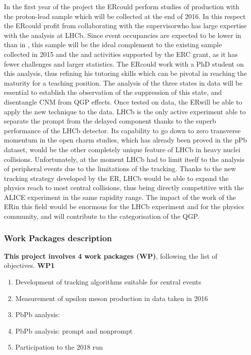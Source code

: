 \documentclass[a4paper,11pt]{article}
\newcommand{\ER}{ER}
\newcommand{\supervisor}{the supervisor}
\begin{document}
In the first year of the project the \ER could perform studies of \PgU
production with the proton-lead sample which will be collected at the
end of 2016. In this respect the \ER could profit from collaborating
with \supervisor who has large expertise with the \PgU analysis at
LHCb. Since event occupancies are expected to be lower in \pPb than in
\PbPb, this sample will be the ideal complement to the existing \PbPb
sample collected in 2015 and the \JPsi and \psiP activities
supported by the ERC grant, as it has fewer challenges and larger
statistics. The \ER could work with a PhD student on this analysis,
thus refining his tutoring skills which can be pivotal in reaching the
maturity for a teaching position.  The analysis of the three \PgUn
states in \pPb data will be essential to establish the observation of
the suppression of this state, and disentangle CNM from QGP effects.
Once tested on \pPb data, the \ER will be able to apply the new
technique to the \PbPb data.  LHCb is the only active experiment able
to separate the prompt from the delayed component thanks to the superb
performance of the LHCb detector. Its capability to go down to zero
transverse momentum in the open charm studies, which has already been
proved in the pPb dataset, would be the other completely unique
feature of LHCb in heavy nuclei collisions. Unfortunately, at the
moment LHCb had to limit itself to the analysis of peripheral events
due to the limitations of the tracking. Thanks to the new tracking
strategy developed by the \ER, LHCb would be able to expand the
physics reach to most central collisions, thus being directly
competitive with the ALICE experiment in the same rapidity range. The
impact of the work of the \ER in this field would be enormous for the
LHCb experiment and for the physics community, and will contribute to
the categorisation of the QGP.

\subsubsection*{Work Packages description}

\textbf{This project involves 4 work packages (WP)}, following the list of objectives. \textbf{WP1}

\begin{enumerate}
 \item Development of tracking algorithms suitable for central events
 \item Measurement of upsilon meson production in \pPb data taken in 2016
 \item PbPb analysis: \Dz 
 \item PbPb analysis: prompt and nonprompt \Jpsi
 \item Participation to the 2018 \PbPb run
\end{enumerate}
\end{document}
